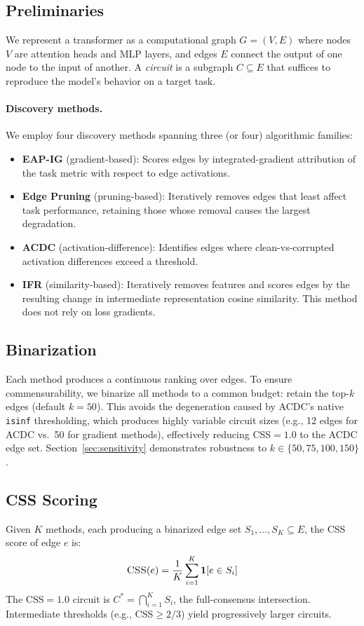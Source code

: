 \documentclass[11pt,a4paper]{article}
\newcommand{\css}{\textsc{CSS}}
\begin{document}
\subsection{Preliminaries}
We represent a transformer as a computational graph $G=(V,E)$ where nodes $V$ are attention heads and MLP layers, and edges $E$ connect the output of one node to the input of another.
A \emph{circuit} is a subgraph $C \subseteq E$ that suffices to reproduce the model's behavior on a target task.

\paragraph{Discovery methods.}
We employ four discovery methods spanning three (or four) algorithmic families:
\begin{itemize}
    \item \textbf{EAP-IG} (gradient-based): Scores edges by integrated-gradient attribution of the task metric with respect to edge activations.
    \item \textbf{Edge Pruning} (pruning-based): Iteratively removes edges that least affect task performance, retaining those whose removal causes the largest degradation.
    \item \textbf{ACDC} (activation-difference): Identifies edges where clean-vs-corrupted activation differences exceed a threshold.
    \item \textbf{IFR} (similarity-based): Iteratively removes features and scores edges by the resulting change in intermediate representation cosine similarity. This method does not rely on loss gradients.
\end{itemize}

\subsection{Binarization}
\label{sec:binarization}
Each method produces a continuous ranking over edges.
To ensure commensurability, we binarize all methods to a common budget: retain the top-$k$ edges (default $k\!=\!50$).
This avoids the degeneration caused by ACDC's native \texttt{isinf} thresholding, which produces highly variable circuit sizes (e.g., 12 edges for ACDC vs.\ 50 for gradient methods), effectively reducing CSS$=1.0$ to the ACDC edge set.
Section~\ref{sec:sensitivity} demonstrates robustness to $k \in \{50, 75, 100, 150\}$.

\subsection{CSS Scoring}
Given $K$ methods, each producing a binarized edge set $S_1, \ldots, S_K \subseteq E$, the \css{} score of edge $e$ is:
\begin{equation}
    \css(e) = \frac{1}{K} \sum_{i=1}^{K} \mathbf{1}[e \in S_i]
\end{equation}
The \css{}$\!=\!1.0$ circuit is $C^* = \bigcap_{i=1}^{K} S_i$, the full-consensus intersection.
Intermediate thresholds (e.g., \css{}$\ge 2/3$) yield progressively larger circuits.
\end{document}
